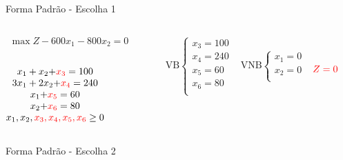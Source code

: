 \begin{frame}
	{
		\begin{block}{Forma Padrão - {\color{cyan}Escolha 1}}
			\begin{columns}
				\begin{column}{0.35\textwidth}
					$
						\begin{matrix}
							\max Z - 600x_1 - 800x_2 = 0 \\
						\end{matrix}
					$ \\
					 \\
					$
						\begin{matrix}
							x_1+x_2  {+\color{red}x_3} = 100 \\
							3x_1+2x_2 {+ \color{red}x_4} = 240 \\
							x_1  {+ \color{red}x_5} = 60 \\
							x_2 {+ \color{red}x_6} = 80 \\
							x_1,x_2, {\color{red} x_3, x_4, x_5, x_6} \ge 0 \\
						\end{matrix}
					$
				\end{column}
				\vline
				\hspace{0.1cm}
				\begin{column}{0.45\textwidth}
					$
						\begin{matrix}
							\text{VB} \left\{  \begin{matrix}
														 x_3 = 100 \\
														 x_4 = 240 \\
														 x_5 = 60 \\
														 x_6 = 80 \\
								   \end{matrix} 
						   \right.
							&
							\text{VNB} \left\{  \begin{matrix}
														 x_1 = 0 \\
														 x_2 = 0 \\
								   \end{matrix} 
						   \right. 
							\\
							 & \\
						\end{matrix}
					$
					$ {\color{red}Z = 0} $
				\end{column}
			\end{columns}
		\end{block}
	}
	{
		\begin{block}{Forma Padrão - {\color{cyan}Escolha 2}}

\end{block}}
\end{frame}
